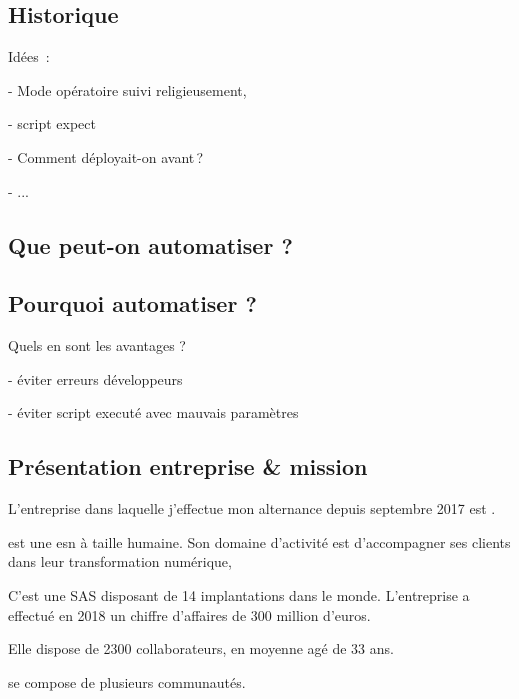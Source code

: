
\subsection{Historique}

Idées : 
	
- Mode opératoire suivi religieusement, 

- script expect

- Comment déployait-on avant ?

-  ...


\subsection{Que peut-on automatiser ?}


\subsection{Pourquoi automatiser ?}

Quels en sont les avantages ?

- éviter erreurs développeurs

- éviter script executé avec mauvais paramètres


\subsection{Présentation entreprise \& mission}

L'entreprise dans laquelle j'effectue mon alternance depuis septembre 2017 est \onepoint. 

\xmakefirstuc{\onepoint{}} est une \gls{esn} à taille humaine. Son domaine d'activité est d'accompagner ses clients dans leur transformation numérique, 

C'est une \gls{SAS} disposant de 14 implantations dans le monde. L'entreprise a effectué en 2018 un chiffre d'affaires de 300 million d'euros.

Elle dispose de 2300 collaborateurs, en moyenne agé de 33 ans.

\xmakefirstuc{\onepoint{}} se compose de plusieurs communautés.

